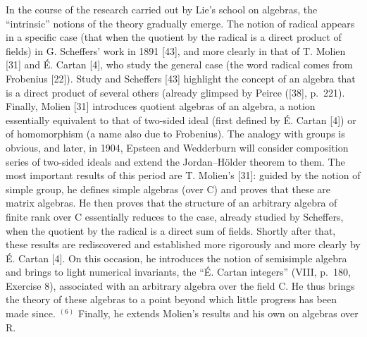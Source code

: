 In the course of the research carried out by Lie's school on algebras, the ``intrinsic'' notions of the theory gradually emerge. The notion of radical appears in a specific case (that when the quotient by the radical is a direct product of fields) in G. Scheffers' work in 1891 {[}43{]}, and more clearly in that of T. Molien {[}31{]} and É. Cartan {[}4{]}, who study the general case (the word radical comes from Frobenius {[}22{]}). Study and Scheffers {[}43{]} highlight the concept of an algebra that is a direct product of several others (already glimpsed by Peirce ({[}38{]}, p.~221). Finally, Molien {[}31{]} introduces quotient algebras of an algebra, a notion essentially equivalent to that of two-sided ideal (first defined by É. Cartan {[}4{]}) or of homomorphism (a name also due to Frobenius). The analogy with groups is obvious, and later, in 1904, Epsteen and Wedderburn will consider composition series of two-sided ideals and extend the Jordan--Hölder theorem to them. The most important results of this period are T. Molien's {[}31{]}: guided by the notion of simple group, he defines simple algebras (over C) and proves that these are matrix algebras. He then proves that the structure of an arbitrary algebra of finite rank over C essentially reduces to the case, already studied by Scheffers, when the quotient by the radical is a direct sum of fields. Shortly after that, these results are rediscovered and established more rigorously and more clearly by É. Cartan {[}4{]}. On this occasion, he introduces the notion of semisimple algebra and brings to light numerical invariants, the ``É. Cartan integers'' (VIII, p.~180, Exercise 8), associated with an arbitrary algebra over the field C. He thus brings the theory of these algebras to a point beyond which little progress has been made since. \(^{(6)}\) Finally, he extends Molien's results and his own on algebras over R.

